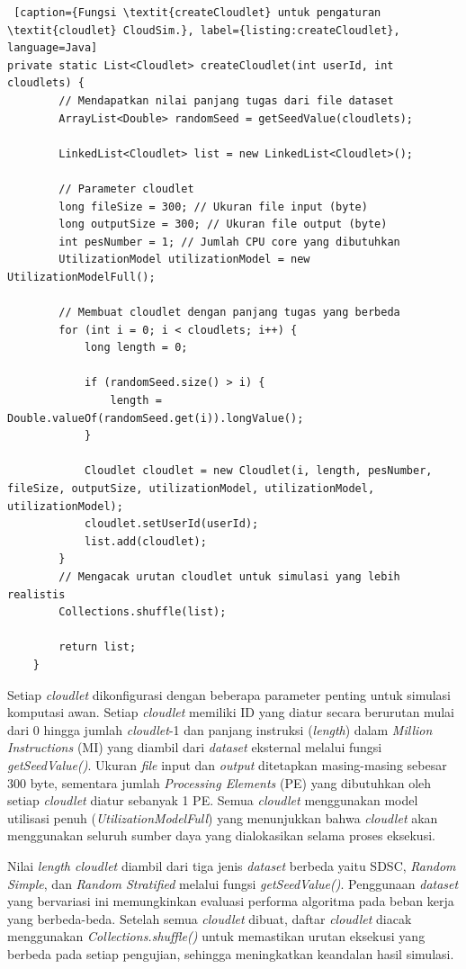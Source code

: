 \begin{lstlisting} [caption={Fungsi \textit{createCloudlet} untuk pengaturan \textit{cloudlet} CloudSim.}, label={listing:createCloudlet}, language=Java]
private static List<Cloudlet> createCloudlet(int userId, int cloudlets) {
        // Mendapatkan nilai panjang tugas dari file dataset
        ArrayList<Double> randomSeed = getSeedValue(cloudlets);

        LinkedList<Cloudlet> list = new LinkedList<Cloudlet>();

        // Parameter cloudlet
        long fileSize = 300; // Ukuran file input (byte)
        long outputSize = 300; // Ukuran file output (byte)
        int pesNumber = 1; // Jumlah CPU core yang dibutuhkan
        UtilizationModel utilizationModel = new UtilizationModelFull();

        // Membuat cloudlet dengan panjang tugas yang berbeda
        for (int i = 0; i < cloudlets; i++) {
            long length = 0;

            if (randomSeed.size() > i) {
                length = Double.valueOf(randomSeed.get(i)).longValue();
            }

            Cloudlet cloudlet = new Cloudlet(i, length, pesNumber, fileSize, outputSize, utilizationModel, utilizationModel, utilizationModel);
            cloudlet.setUserId(userId);
            list.add(cloudlet);
        }
        // Mengacak urutan cloudlet untuk simulasi yang lebih realistis
        Collections.shuffle(list);

        return list;
    }
\end{lstlisting}

Setiap \textit{cloudlet} dikonfigurasi dengan beberapa parameter penting untuk simulasi komputasi awan. Setiap \textit{cloudlet} memiliki ID yang diatur secara berurutan mulai dari 0 hingga jumlah\textit{ cloudlet}-1 dan panjang instruksi (\textit{length}) dalam \textit{Million Instructions} (MI) yang diambil dari \textit{dataset} eksternal melalui fungsi \textit{getSeedValue()}. Ukuran \textit{file} input dan \textit{output} ditetapkan masing-masing sebesar 300 byte, sementara jumlah \textit{Processing Elements} (PE) yang dibutuhkan oleh setiap \textit{cloudlet} diatur sebanyak 1 PE. Semua \textit{cloudlet} menggunakan model utilisasi penuh (\textit{UtilizationModelFull}) yang menunjukkan bahwa \textit{cloudlet} akan menggunakan seluruh sumber daya yang dialokasikan selama proses eksekusi.

Nilai \textit{length cloudlet} diambil dari tiga jenis \textit{dataset} berbeda yaitu SDSC, \textit{Random Simple}, dan \textit{Random Stratified} melalui fungsi \textit{getSeedValue()}. Penggunaan \textit{dataset} yang bervariasi ini memungkinkan evaluasi performa algoritma pada beban kerja yang berbeda-beda. Setelah semua \textit{cloudlet} dibuat, daftar \textit{cloudlet} diacak menggunakan \textit{Collections.shuffle()} untuk memastikan urutan eksekusi yang berbeda pada setiap pengujian, sehingga meningkatkan keandalan hasil simulasi.

